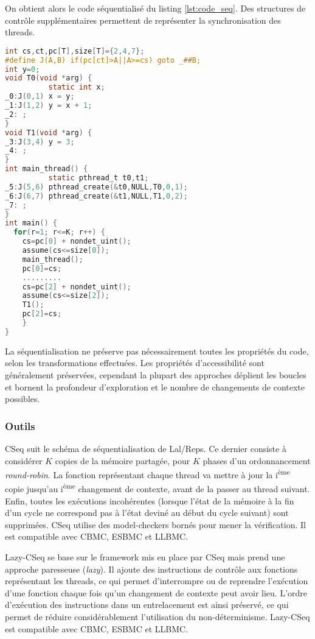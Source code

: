 On obtient alors le code séquentialisé du listing \ref{lst:code_seq}.
Des structures de contrôle supplémentaires permettent de représenter la
synchronisation des threads.

\begin{lstlisting}[language=C, label=lst:code_seq, frame=single,
  caption=Code séquentialisé, float=*]
int cs,ct,pc[T],size[T]={2,4,7};
#define J(A,B) if(pc[ct]>A||A>=cs) goto _##B;
int y=0;
void T0(void *arg) {
          static int x;
_0:J(0,1) x = y;
_1:J(1,2) y = x + 1;
_2: ;
}
void T1(void *arg) {
_3:J(3,4) y = 3;
_4: ;
}
int main_thread() {
          static pthread_t t0,t1;
_5:J(5,6) pthread_create(&t0,NULL,T0,0,1);
_6:J(6,7) pthread_create(&t1,NULL,T1,0,2);
_7: ;
}
int main() {
  for(r=1; r<=K; r++) {
    cs=pc[0] + nondet_uint();
    assume(cs<=size[0]);
    main_thread();
    pc[0]=cs;
    .........
    cs=pc[2] + nondet_uint();
    assume(cs<=size[2]);
    T1();
    pc[2]=cs;
    }
}
\end{lstlisting}

La séquentialisation ne préserve pas nécessairement toutes les
propriétés du code, selon les transformations effectuées. Les propriétés
d'accessibilité sont généralement préservées, cependant la plupart des
approches déplient les boucles et bornent la profondeur d'exploration et
le nombre de changements de contexte possibles.

\subsubsection{Outils}

CSeq\cite{CSeq} suit le schéma de séquentialisation de Lal/Reps. Ce dernier
consiste à considérer \(K\) copies de la mémoire partagée, pour \(K\) phases
d'un ordonnancement \emph{round-robin}. La fonction représentant chaque thread
va mettre à jour la i\textsuperscript{ème} copie jusqu'au i\textsuperscript{ème}
changement de contexte, avant de la passer au thread suivant. Enfin, toutes les
exécutions incohérentes (lorsque l'état de la mémoire à la fin d'un cycle ne
correspond pas à l'état deviné au début du cycle suivant) sont supprimées. CSeq
utilise des model-checkers bornés pour mener la vérification. Il est compatible
avec CBMC, ESBMC et LLBMC.

Lazy-CSeq\cite{LazyCSeq} se base sur le framework mis en place par CSeq mais
prend une approche paresseuse (\emph{lazy}). Il ajoute des instructions de
contrôle aux fonctions représentant les threads, ce qui permet d'interrompre ou
de reprendre l'exécution d'une fonction chaque fois qu'un changement de contexte
peut avoir lieu. L'ordre d'exécution des instructions dans un entrelacement est
ainsi préservé, ce qui permet de réduire considérablement l'utilisation du
non-déterminisme. Lazy-CSeq est compatible avec CBMC, ESBMC et LLBMC.


